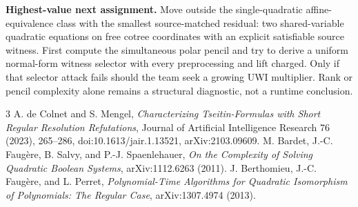 \documentclass[11pt]{article}
\begin{document}
\textbf{Highest-value next assignment.}  Move outside the single-quadratic
affine-equivalence class with the smallest source-matched residual: two
shared-variable quadratic equations on free cotree coordinates with an explicit
satisfiable source witness.  First compute the simultaneous polar pencil and
try to derive a uniform normal-form witness selector with every preprocessing
and lift charged.  Only if that selector attack fails should the team seek a
growing UWI multiplier.  Rank or pencil complexity alone remains a structural
diagnostic, not a runtime conclusion.

\begin{thebibliography}{3}
A. de Colnet and S. Mengel,
\emph{Characterizing Tseitin-Formulas with Short Regular Resolution Refutations},
Journal of Artificial Intelligence Research 76 (2023), 265--286,
doi:10.1613/jair.1.13521, arXiv:2103.09609.
M. Bardet, J.-C. Faug\`ere, B. Salvy, and P.-J. Spaenlehauer,
\emph{On the Complexity of Solving Quadratic Boolean Systems},
arXiv:1112.6263 (2011).
J. Berthomieu, J.-C. Faug\`ere, and L. Perret,
\emph{Polynomial-Time Algorithms for Quadratic Isomorphism of Polynomials: The Regular Case},
arXiv:1307.4974 (2013).
\end{thebibliography}
\end{document}
